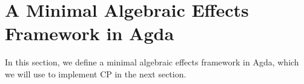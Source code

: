 \section{A Minimal Algebraic Effects Framework in Agda}

In this section, we define a minimal algebraic effects framework in Agda, which we will use to implement CP in the next section.

